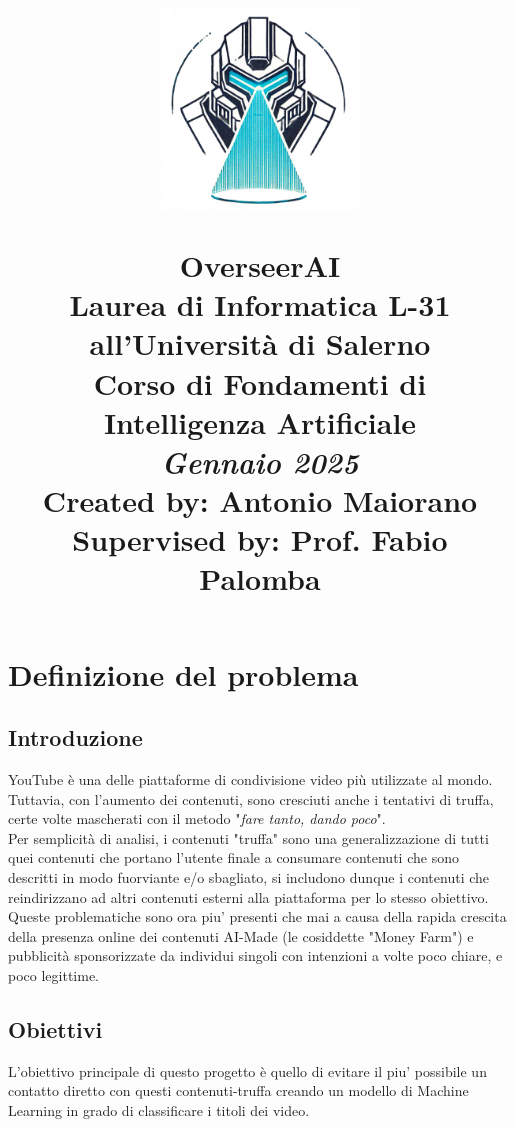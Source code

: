 \documentclass[a4paper,12pt]{report}
\title{
    \includegraphics[width=0.40\textwidth]{images/logo_overseerai.png}
    
    \textbf{\Huge OverseerAI} \\
    \vspace{1cm} %
    \large Laurea di Informatica L-31 all'Università di Salerno \\
    \large Corso di Fondamenti di Intelligenza Artificiale \\
    \vspace{0.5cm} %
    \small \textit{Gennaio 2025} \\
    \vspace{3cm}
    \textbf{Created by: }{\large Antonio Maiorano} \\
    \vspace{0.5cm}
    \textbf{Supervised by: }{\large Prof. Fabio Palomba}
}
\date{}
\begin{document}
\maketitle
\thispagestyle{empty}
\newpage

\renewcommand*\contentsname{\hfill Indice \hfill}
\setcounter{page}{1}  %
\tableofcontents
\newpage

\begingroup%
\makeatletter%
\let\clearpage\relax%
\vspace*{\fill}%
\vspace*{\dimexpr-50\p@-\baselineskip}%
\chapter{Definizione del problema}
\vspace*{\fill}%
\endgroup
\newpage


\section{Introduzione}
YouTube è una delle piattaforme di condivisione video più utilizzate al mondo. Tuttavia, con l'aumento dei contenuti, sono cresciuti anche i tentativi di truffa, certe volte mascherati con il metodo "\textit{fare tanto, dando poco}".\\
Per semplicità di analisi, i contenuti "truffa" sono una generalizzazione di tutti quei contenuti che portano l'utente finale a consumare contenuti che sono descritti in modo fuorviante e/o sbagliato, si includono dunque i contenuti che reindirizzano ad altri contenuti esterni alla piattaforma per lo stesso obiettivo.\\
Queste problematiche sono ora piu' presenti che mai a causa della rapida crescita della presenza online dei contenuti AI-Made (le cosiddette "Money Farm") e pubblicità sponsorizzate da individui singoli con intenzioni a volte poco chiare, e poco legittime.

\section{Obiettivi}
L'obiettivo principale di questo progetto è quello di evitare il piu' possibile un contatto diretto con questi contenuti-truffa creando un modello di Machine Learning in grado di classificare i titoli dei video.
\end{document}
